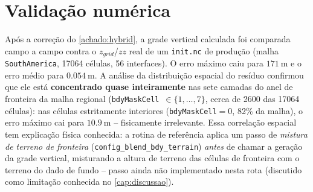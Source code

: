 \section{Validação numérica}
\label{sec:validacao_fase2}

Após a correção do \cref{achado:hybrid}, a grade vertical calculada foi
comparada campo a campo contra o $z_{grid}$/$zz$ real de um
\texttt{init.nc} de produção (malha \texttt{SouthAmerica}, 17064 células,
56 interfaces). O erro máximo caiu para $\SI{171}{\metre}$ e o erro médio
para $\SI{0,054}{\metre}$. A análise da distribuição espacial do resíduo
confirmou que ele está \textbf{concentrado quase inteiramente} nas sete
camadas do anel de fronteira da malha regional
(\texttt{bdyMaskCell}~$\in\{1,\dots,7\}$, cerca de 2600 das 17064
células): nas células estritamente interiores
(\texttt{bdyMaskCell}$=0$, 82\% da malha), o erro máximo cai para
$\SI{10,9}{\metre}$ -- fisicamente irrelevante. Essa correlação espacial
tem explicação física conhecida: a rotina de referência aplica um passo
de \emph{mistura de terreno de fronteira}
(\texttt{config\_blend\_bdy\_terrain}) \emph{antes} de chamar a geração
da grade vertical, misturando a altura de terreno das células de
fronteira com o terreno do dado de fundo -- passo ainda não implementado
nesta rota (discutido como limitação conhecida no
\cref{cap:discussao}).
